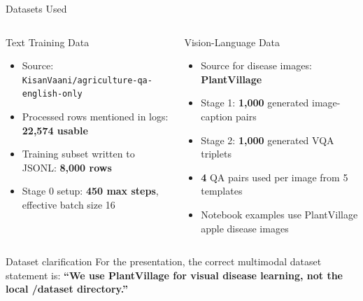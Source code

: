 \documentclass[aspectratio=169,11pt]{beamer}
\begin{document}
\begin{frame}{Datasets Used}
\begin{columns}[T]
    \begin{block}{Text Training Data}
    \begin{itemize}
        \item Source: \texttt{KisanVaani/agriculture-qa-english-only}
        \item Processed rows mentioned in logs: \textbf{22,574 usable}
        \item Training subset written to JSONL: \textbf{8,000 rows}
        \item Stage 0 setup: \textbf{450 max steps}, effective batch size 16
    \end{itemize}
    \end{block}

    \begin{block}{Vision-Language Data}
    \begin{itemize}
        \item Source for disease images: \textbf{PlantVillage}
        \item Stage 1: \textbf{1,000} generated image-caption pairs
        \item Stage 2: \textbf{1,000} generated VQA triplets
        \item \textbf{4} QA pairs used per image from 5 templates
        \item Notebook examples use PlantVillage apple disease images
    \end{itemize}
    \end{block}
\end{columns}
\vspace{0.4em}
\begin{alertblock}{Dataset clarification}
For the presentation, the correct multimodal dataset statement is:
\textbf{``We use PlantVillage for visual disease learning, not the local /dataset directory.''}
\end{alertblock}
\end{frame}
\end{document}
